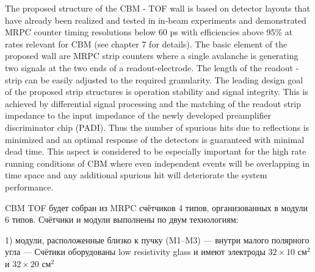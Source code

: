 The proposed structure of the CBM - TOF wall is based on detector layouts that have already been realized and tested in in-beam experiments and demonstrated MRPC counter timing resolutions below 60 ps with efficiencies above 95\% at rates relevant for CBM (see chapter 7 for details).
The basic element of the proposed wall are MRPC strip counters where a single avalanche is generating two signals at the two ends of a readout-electrode. The length of the readout - strip can be easily adjusted to the required granularity. The leading design goal of the proposed strip structures is operation stability and signal integrity. This is achieved by differential signal processing and the matching of the readout strip impedance to the input impedance of the newly developed preamplifier discriminator chip (PADI). Thus the number of spurious hits due to reflections is minimized and an optimal response of the detectors is guaranteed with minimal dead time. This aspect is considered to be especially important for the high rate running conditions of CBM where even independent events will be overlapping in time space and any additional spurious hit will deteriorate the system performance.

CBM TOF будет собран из MRPC счётчиков 4 типов, организованных в модули 6 типов. Счётчики и модули выполнены по двум технологиям:



1) модули, расположенные близко к пучку (M1--M3) --- внутри малого полярного угла --- \todo
Счётики оборудованы low resistivity glass и имеют электроды $32 \times 10$ см$^2$ и $32 \times 20$ см$^2$



